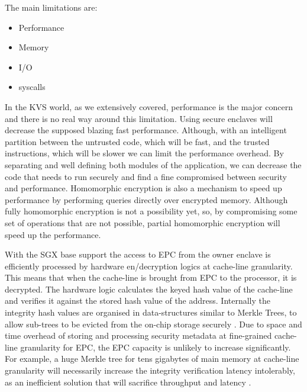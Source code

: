 The main limitations are: 

\begin{itemize}
	\item Performance
	\item Memory
	\item \gls{I/O}
	\item \glspl{syscall}
\end{itemize}

In the \gls{KVS} world, as we extensively covered, performance is the major concern and there is no real way around this limitation. Using secure enclaves will decrease the supposed blazing fast performance. Although, with an intelligent partition between the untrusted code, which will be fast, and the trusted instructions, which will be slower we can limit the performance overhead. By separating and well defining both modules of the application, we can decrease the code that needs to run securely and find a fine compromised between security and performance. Homomorphic encryption is also a mechanism to speed up performance by performing queries directly over encrypted memory. Although fully homomorphic encryption is not a possibility yet, so, by compromising some set of operations that are not possible, partial homomorphic encryption will speed up the performance.

With the \gls{SGX} base support the access to \gls{EPC} from the owner enclave is efficiently processed by hardware en/decryption logics at cache-line granularity. This means that when the cache-line is brought from \gls{EPC} to the processor, it is decrypted. The hardware logic calculates the keyed hash value of the cache-line and verifies it against the stored hash value of the address. Internally the integrity hash values are organised in data-structures similar to Merkle Trees, to allow sub-trees to be evicted from the on-chip storage securely \cite{cryptoeprint:2016:204}. Due to space and time overhead of storing and processing security metadata at fine-grained cache-line granularity for \gls{EPC}, the \gls{EPC} capacity is unlikely to increase significantly. For example, a huge Merkle tree for tens gigabytes of main memory at cache-line granularity will necessarily increase the integrity verification latency intolerably, as an inefficient solution that will sacrifice throughput and latency \cite{Taassori2018VAULTRP}.

